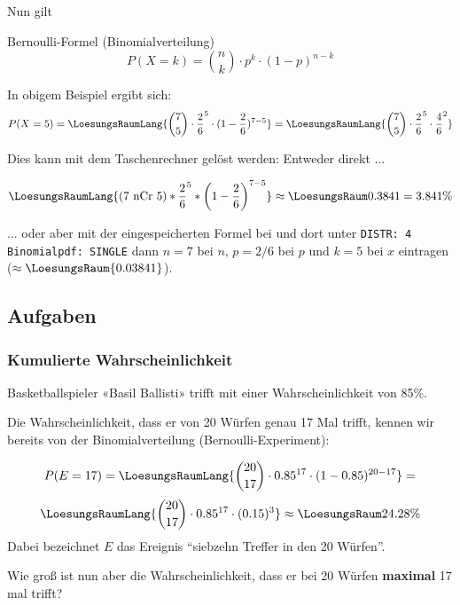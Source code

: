 Nun gilt

\begin{gesetz}{Bernoulli-Formel (Binomialverteilung)}{}
  $$P(X=k) = {{n}\choose {k}}\cdot{}p^k\cdot{}(1-p)^{n-k}$$
\end{gesetz}

In obigem Beispiel ergibt sich:
$$P(X=5) = \LoesungsRaumLang{{7\choose 5} \cdot{} \frac26^5 \cdot{} (1-\frac26)^{7-5}} = \LoesungsRaumLang{{7\choose 5} \cdot{} \frac26^5 \cdot{} \frac46^2}$$

Dies kann mit dem Taschenrechner gelöst werden:
Entweder direkt ...

$$\LoesungsRaumLang{( 7 \textrm{\,\,nCr\,\,} 5 ) *\frac26^5 *
\left(1-\frac26\right)^{7-5}} \approx \LoesungsRaum{0.3841 = 3.841\%}$$

... oder aber mit der eingespeicherten Formel bei
 und dort unter \texttt{DISTR: 4
  Binomialpdf: SINGLE} dann $n=7$ bei $n$, $p=2/6$ bei $p$ und
$k=5$ bei $x$ eintragen ($\approx \LoesungsRaum{0.03841}$).
\newpage

\subsection*{Aufgaben}



\newpage
\subsubsection{Kumulierte Wahrscheinlichkeit}

Basketballspieler «Basil Ballisti» trifft mit einer
Wahrscheinlichkeit von 85\%.

Die Wahrscheinlichkeit, dass er von 20 Würfen genau 17 Mal trifft, kennen wir
bereits von der Binomialverteilung (Bernoulli-Experiment):

$$P(E=17) = \LoesungsRaumLang{{20 \choose 17}\cdot 0.85^{17}\cdot(1-0.85)^{20-17}}=$$
$$\LoesungsRaumLang{{20 \choose 17}\cdot 0.85^{17}\cdot (0.15)^{3}}\approx{}\LoesungsRaum{24.28\%}$$
Dabei bezeichnet $E$ das Ereignis ``siebzehn Treffer in den 20 Würfen''.

Wie groß ist nun aber die Wahrscheinlichkeit, dass er bei 20 Würfen
\textbf{maximal} 17 mal trifft?

